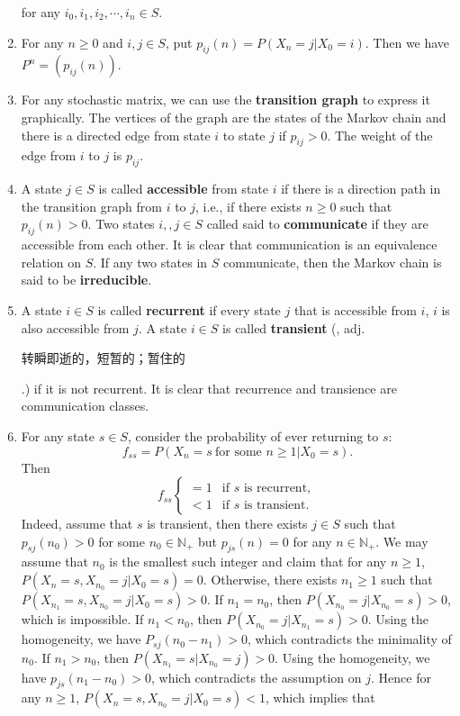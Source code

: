 \documentclass[12pt,letterpaper, onecolumn]{exam}
\begin{document}
\begin{enumerate}
        for any $i_0,i_1,i_2,\cdots,i_n\in S$.
        \item For any $n\ge 0$ and $i,j\in S$, put $p_{ij}(n)=P(X_n=j|X_0=i)$. Then we have $P^n=(p_{ij}(n))$.
        \item For any stochastic matrix, we can use the \textbf{transition graph} to express it graphically. The vertices of the graph are the states of the Markov chain and there is a directed edge from state $i$ to state $j$ if $p_{ij}>0$. The weight of the edge from $i$ to $j$ is $p_{ij}$.
    \item A state $j\in S$ is called \textbf{accessible} from state $i$ if there is a direction path in the transition graph from $i$ to $j$, i.e., if there exists $n\ge 0$ such that $p_{ij}(n)>0$. Two states $i,,j\in S$ called said to \textbf{communicate} if they are accessible from each other. It is clear that communication is an equivalence relation on $S$. If any two states in $S$ communicate, then the Markov chain is said to be \textbf{irreducible}.
    \item A state $i\in S$ is called \textbf{recurrent} if every state $j$ that is accessible from $i$, $i$ is also accessible from $j$. A state $i\in S$ is called \textbf{transient} (, adj. \begin{CJK}{UTF8}{gbsn}转瞬即逝的，短暂的；暂住的\end{CJK}.) if it is not recurrent. It is clear that recurrence and transience are communication classes.
    \item For any state $s\in S$, consider the probability of ever returning to $s$: 
    $$f_{ss}=P(X_n=s\ \text{for some }n\ge 1|X_0=s).$$
    Then 
    $$f_{ss}\begin{cases}
        =1&\text{if $s$ is recurrent},\\
        <1&\text{if $s$ is transient}.
    \end{cases}$$
    Indeed, assume that $s$ is transient, then there exists $j\in S$ such that $p_{sj}(n_0)>0$ for some $n_0\in\mathbb{N}_+$ but $p_{js}(n)=0$ for any $n\in\mathbb{N}_+$. We may assume that $n_0$ is the smallest such integer and claim that for any $n\ge 1$, $P(X_n=s,X_{n_0}=j|X_0=s)=0$. Otherwise, there exists $n_1\ge 1$ such that $P(X_{n_1}=s,X_{n_0}=j|X_0=s)>0$. If $n_1=n_0$, then $P(X_{n_0}=j|X_{n_0}=s)>0$, which is impossible. If $n_1<n_0$, then $P(X_{n_0}=j|X_{n_1}=s)>0$. Using the homogeneity, we have $P_{sj}(n_0-n_1)>0$, which contradicts the minimality of $n_0$. If $n_1>n_0$, then $P(X_{n_1}=s|X_{n_0}=j)>0$. Using the homogeneity, we have $p_{js}(n_1-n_0)>0$, which contradicts the assumption on $j$. Hence for any $n\ge 1$, $P(X_n=s,X_{n_0}=j|X_0=s)<1$, which implies that 

\end{enumerate}
\end{document}
